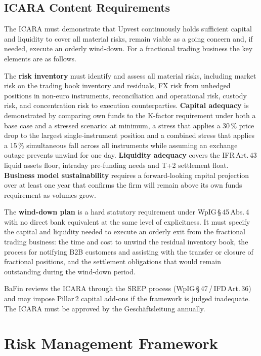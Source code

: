 \documentclass[12pt,a4paper]{report}
\begin{document}
\section{ICARA Content Requirements}

The ICARA must demonstrate that Upvest continuously holds sufficient capital and liquidity
to cover all material risks, remain viable as a going concern and, if needed, execute an
orderly wind-down. For a fractional trading business the key elements are as follows.

The \textbf{risk inventory} must identify and assess all material risks, including market
risk on the trading book inventory and residuals, FX risk from unhedged positions in
non-euro instruments, reconciliation and operational risk, custody risk, and concentration
risk to execution counterparties. \textbf{Capital adequacy} is demonstrated by comparing
own funds to the K-factor requirement under both a base case and a stressed scenario: at
minimum, a stress that applies a 30\,\% price drop to the largest single-instrument
position and a combined stress that applies a 15\,\% simultaneous fall across all
instruments while assuming an exchange outage prevents unwind for one day.
\textbf{Liquidity adequacy} covers the IFR\,Art.\,43 liquid assets floor, intraday
pre-funding needs and T+2 settlement float. \textbf{Business model sustainability} requires
a forward-looking capital projection over at least one year that confirms the firm will
remain above its own funds requirement as volumes grow.

The \textbf{wind-down plan} is a hard statutory requirement under WpIG\,\S\,45\,Abs.\,4
with no direct bank equivalent at the same level of explicitness. It must specify the
capital and liquidity needed to execute an orderly exit from the fractional trading
business: the time and cost to unwind the residual inventory book, the process for
notifying B2B customers and assisting with the transfer or closure of fractional
positions, and the settlement obligations that would remain outstanding during the
wind-down period.

BaFin reviews the ICARA through the SREP process (WpIG\,\S\,47\,/\,IFD\,Art.\,36) and
may impose Pillar\,2 capital add-ons if the framework is judged inadequate. The ICARA
must be approved by the Gesch{\"a}ftsleitung annually.

\chapter{Risk Management Framework}
\end{document}
